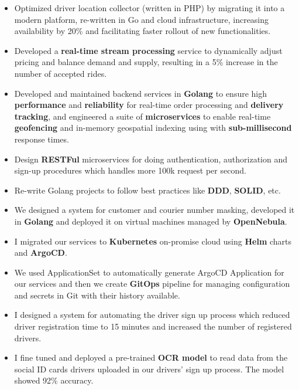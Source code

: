 \begin{itemize}
      \item Optimized driver location collector (written in PHP) by migrating it into a modern platform, re-written in Go and cloud infrastructure,
            increasing availability by 20\% and facilitating faster rollout of new functionalities.
      \item Developed a \textbf{real-time stream processing} service to dynamically adjust pricing and balance demand and supply,
            resulting in a 5\% increase in the number of accepted rides.
      \item Developed and maintained backend services in \textbf{Golang} to ensure
            high \textbf{performance} and \textbf{reliability} for real-time order processing and \textbf{delivery tracking},
            and engineered a suite of \textbf{microservices} to enable real-time \textbf{geofencing} and in-memory geospatial
            indexing using  with \textbf{sub-millisecond} response times.
      \item Design \textbf{RESTFul} microservices for doing authentication, authorization and sign-up procedures which handles more 100k request per second.
      \item Re-write Golang projects to follow best practices like \textbf{DDD}, \textbf{SOLID}, etc.
      \item We designed a system for customer and courier number masking, developed it in \textbf{Golang}
            and deployed it on virtual machines managed by \textbf{OpenNebula}.
      \item I migrated our services to \textbf{Kubernetes} on-promise cloud using \textbf{Helm} charts and \textbf{ArgoCD}.
      \item We used  ApplicationSet to automatically generate ArgoCD Application
            for our services and then we create \textbf{GitOps} pipeline for managing configuration
            and secrets in Git with their history available.
      \item I designed a system for automating the driver sign up process which reduced driver registration time to 15 minutes and increased the number of registered drivers.
      \item I fine tuned and deployed a pre-trained \textbf{OCR model} to read data from the social ID cards drivers uploaded in our drivers' sign up process. The model showed 92\% accuracy.

\end{itemize}
